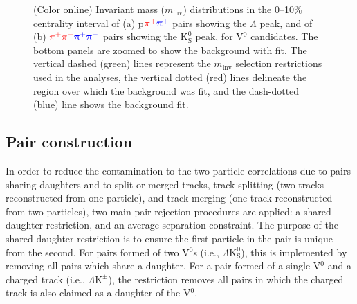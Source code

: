 \documentclass[ALICE,manyauthors]{cernphprep}
\newcommand{\minv}{$m_{\mathrm{inv}}$\xspace}
\newcommand{\Lam}{$\Lambda$\xspace}
\newcommand{\Ks}{$\mathrm{K^{0}_{S}}$\xspace}
\newcommand{\LamKpm}{$\Lambda\mathrm{K^{\pm}}$\xspace}
\newcommand{\LamKs}{$\Lambda\mathrm{K^{0}_{S}}$\xspace}
\newcommand{\Vz}{V$^{0}$\xspace}
\begin{document}
\begin{figure}[htp]
  \centering
  \caption{
  (Color online) Invariant mass {\color{red}(\minv)} distributions {\color{blue}in the 0--10\% centrality interval} of (a) p${\color{red}\pi^{+}}{\color{blue}\uppi^{+}}$ pairs showing the \Lam peak, and of (b) ${\color{red}\pi^{+}\pi^{-}}{\color{blue}\uppi^{+}\uppi^{-}}$ pairs showing the \Ks peak, for \Vz candidates.  
  The bottom panels are zoomed to show the background with fit.  
  The vertical dashed {\color{blue}(green)} lines represent the {\color{red}\minv} {\color{blue}selection} restrictions used in the analyses, the vertical dotted {\color{blue}(red)} lines delineate the region over which the background was fit, and the dash-dotted {\color{blue}(blue)} line shows the background fit.
  }  
  \label{fig:Purity}
\end{figure}





\subsection{Pair construction}
\label{PairConstruction}

In order to reduce the contamination to the two-particle correlations due to pairs sharing daughters {\color{red}and to split or merged tracks}, {\color{blue}track splitting (two tracks reconstructed from one particle), and track merging (one track reconstructed from two particles)}, two main pair rejection procedures are applied: a shared daughter restriction, and an average separation constraint.
The purpose of the shared daughter restriction is to ensure the first particle in the pair is unique from the second.  
For pairs formed of two V$^{0}$s (i.e., \LamKs), this is implemented by removing all pairs which share a daughter.  
For a pair formed of a single \Vz and a charged track (i.e., \LamKpm), the restriction removes all pairs in which the charged track is also claimed as a daughter of the \Vz.  
\end{document}
